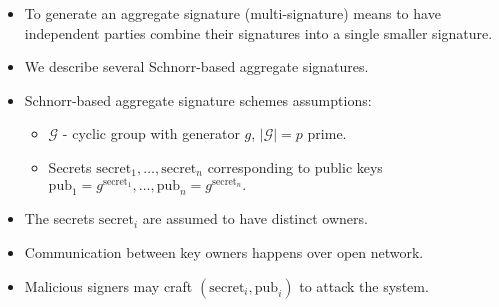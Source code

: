\begin{frame}
\begin{itemize}
\item To generate an aggregate signature (multi-signature) means to have independent parties combine their signatures into a single smaller signature.
\item We describe several Schnorr-based aggregate signatures. 
\item Schnorr-based aggregate signature schemes assumptions:
\begin{emptyTheorem}
\begin{itemize}
\item $\mathcal G$ - cyclic group with generator $g$, $\left|\mathcal G\right| = p$ prime.
\item Secrets $\mathrm{secret}_1, \dots, \mathrm{secret}_n $ corresponding to public keys $\mathrm{pub}_1 = g^{\mathrm{secret}_1}, \dots, \mathrm{pub}_n = g^{\mathrm{secret}_n}.$
\end{itemize}
\end{emptyTheorem}
\item The secrets $\mathrm{secret}_i$ are assumed to have distinct owners. 
\item Communication between key owners happens over open network. 
\item Malicious signers may craft $\left(\mathrm{secret}_i, \mathrm{pub}_i\right)$ to attack the system.
\end{itemize}

\end{frame}